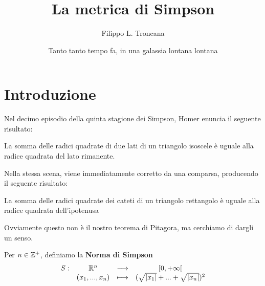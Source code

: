 \documentclass{article}
\title{La metrica di Simpson}
\author{Filippo L. Troncana}
\date{Tanto tanto tempo fa, in una galassia lontana lontana}
\begin{document}
\maketitle

\section{Introduzione}

Nel decimo episodio della quinta stagione dei Simpson, Homer enuncia il seguente risultato:

\begin{theorem}
    La somma delle radici quadrate di due lati di un triangolo isoscele è uguale alla radice quadrata del lato rimanente.
\end{theorem}

Nella stessa scena, viene immediatamente corretto da una comparsa, producendo il seguente risultato:

\begin{theorem}
    La somma delle radici quadrate dei cateti di un triangolo rettangolo è uguale alla radice quadrata dell'ipotenusa
\end{theorem}

Ovviamente questo non è il nostro teorema di Pitagora, ma cerchiamo di dargli un senso.

\begin{definition}
    Per $n \in \mathbb{Z}^+$, definiamo la \textbf{Norma di Simpson}
    \[\begin{array}{cccc} S : & \mathbb{R}^n & \longrightarrow & [0,+\infty[\\ \quad & (x_1,...,x_n) & \longmapsto & (\sqrt{|x_1|}+...+\sqrt{|x_n|})^2 \end{array}\]
\end{definition}
\end{document}
